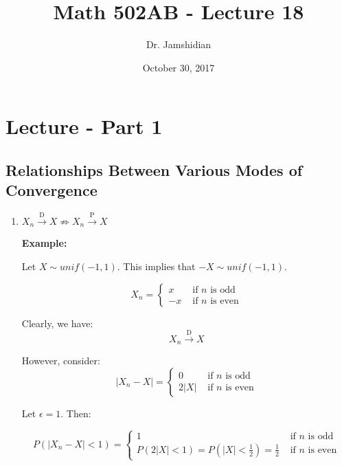 \documentclass{article}
\title{Math 502AB - Lecture 18}
\author{Dr. Jamshidian}
\date{October 30, 2017}
\begin{document}
\maketitle

\section{Lecture - Part 1}

\subsection{Relationships Between Various Modes of Convergence}
\begin{enumerate}
    \item $X_n \xrightarrow{\text{D}} X \not\Rightarrow X_n \xrightarrow{\text{P}} X$
    
    \textbf{Example:}
    
    Let $X \sim unif(-1,1)$. This implies that $-X \sim unif(-1,1)$.
    
    \begin{equation*}
        X_n = \begin{cases}
            x & \text{ if $n$ is odd}\\
            -x & \text{ if $n$ is even}
        \end{cases}
    \end{equation*}
    
    Clearly, we have:
    \begin{equation*}
        X_n \xrightarrow{\text{D}} X
    \end{equation*}
    
    However, consider:
    \begin{equation*}
        |X_n-X| = \begin{cases}
            0 & \text{ if $n$ is odd}\\
            2|X| & \text{ if $n$ is even}
        \end{cases}
    \end{equation*}
    
    Let $\epsilon = 1$. Then:
    
    \begin{equation*}
        P(|X_n-X|<1) = \begin{cases}
            1 & \text{ if $n$ is odd}\\
            P(2|X|<1) = P(|X|<\frac{1}{2}) = \frac{1}{2} & \text{ if $n$ is even}
        \end{cases}
    \end{equation*}
    

\end{enumerate}
\end{document}
